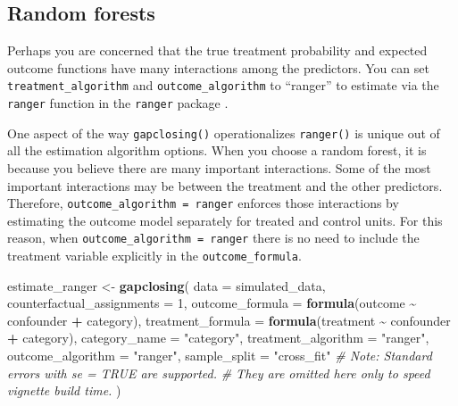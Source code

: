 \documentclass[
]{article}
\newenvironment{Shaded}{\begin{snugshade}}{\end{snugshade}}
\newcommand{\AttributeTok}[1]{\textcolor[rgb]{0.13,0.29,0.53}{#1}}
\newcommand{\CommentTok}[1]{\textcolor[rgb]{0.56,0.35,0.01}{\textit{#1}}}
\newcommand{\DecValTok}[1]{\textcolor[rgb]{0.00,0.00,0.81}{#1}}
\newcommand{\FunctionTok}[1]{\textcolor[rgb]{0.13,0.29,0.53}{\textbf{#1}}}
\newcommand{\NormalTok}[1]{#1}
\newcommand{\OtherTok}[1]{\textcolor[rgb]{0.56,0.35,0.01}{#1}}
\newcommand{\SpecialCharTok}[1]{\textcolor[rgb]{0.81,0.36,0.00}{\textbf{#1}}}
\newcommand{\StringTok}[1]{\textcolor[rgb]{0.31,0.60,0.02}{#1}}
\begin{document}
\subsection{Random forests}\label{random-forests}

Perhaps you are concerned that the true treatment probability and expected outcome functions have many interactions among the predictors. You can set \texttt{treatment\_algorithm} and \texttt{outcome\_algorithm} to ``ranger'' to estimate via the \texttt{ranger} function in the \texttt{ranger} package \citep{ranger}.

One aspect of the way \texttt{gapclosing()} operationalizes \texttt{ranger()} is unique out of all the estimation algorithm options. When you choose a random forest, it is because you believe there are many important interactions. Some of the most important interactions may be between the treatment and the other predictors. Therefore, \texttt{outcome\_algorithm\ =\ ranger} enforces those interactions by estimating the outcome model separately for treated and control units. For this reason, when \texttt{outcome\_algorithm\ =\ ranger} there is no need to include the treatment variable explicitly in the \texttt{outcome\_formula}.

\begin{Shaded}
\begin{Highlighting}[]
\NormalTok{estimate\_ranger }\OtherTok{\textless{}{-}} \FunctionTok{gapclosing}\NormalTok{(}
  \AttributeTok{data =}\NormalTok{ simulated\_data,}
  \AttributeTok{counterfactual\_assignments =} \DecValTok{1}\NormalTok{,}
  \AttributeTok{outcome\_formula =} \FunctionTok{formula}\NormalTok{(outcome }\SpecialCharTok{\textasciitilde{}}\NormalTok{ confounder }\SpecialCharTok{+}\NormalTok{ category),}
  \AttributeTok{treatment\_formula =} \FunctionTok{formula}\NormalTok{(treatment }\SpecialCharTok{\textasciitilde{}}\NormalTok{ confounder }\SpecialCharTok{+}\NormalTok{ category),}
  \AttributeTok{category\_name =} \StringTok{"category"}\NormalTok{,}
  \AttributeTok{treatment\_algorithm =} \StringTok{"ranger"}\NormalTok{,}
  \AttributeTok{outcome\_algorithm =} \StringTok{"ranger"}\NormalTok{,}
  \AttributeTok{sample\_split =} \StringTok{"cross\_fit"}
  \CommentTok{\# Note: Standard errors with \textasciigrave{}se = TRUE\textasciigrave{} are supported.}
  \CommentTok{\# They are omitted here only to speed vignette build time.}
\NormalTok{)}
\end{Highlighting}
\end{Shaded}
\end{document}
